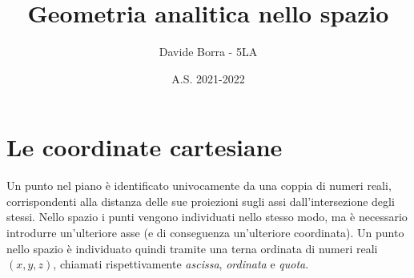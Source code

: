 \documentclass{article}     %
\title{Geometria analitica nello spazio}
\author{Davide Borra - 5LA}
\date{A.S. 2021-2022}
\begin{document}
    \begin{titlepage}
    \maketitle
    \tableofcontents
    \end{titlepage}
    
    \chead{}
    \section{Le coordinate cartesiane}
        Un punto nel piano è identificato univocamente da una coppia di numeri reali, corrispondenti alla distanza delle sue proiezioni sugli assi dall'intersezione degli stessi. Nello spazio i punti vengono individuati nello stesso modo, ma è necessario introdurre un'ulteriore asse (e di conseguenza un'ulteriore coordinata). Un punto nello spazio è individuato quindi tramite una terna ordinata di numeri reali $(x,y,z)$, chiamati rispettivamente \textit{ascissa}, \textit{ordinata} e \textit{quota}.
\end{document}

